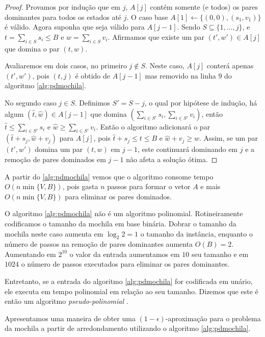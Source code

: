 \begin{proof}
Provamos por indução que em $j$, $A[j]$ contém somente (e todos) os pares dominantes para todos os estados até $j$. O caso base $A[1] \leftarrow \{(0,0),(s_1,v_1)\}$ é válido. Agora suponha que seja válido para $A[j-1]$. Sendo $S \subseteq \{1, \ldots, j\}$, e $t=\sum_{i \in S} s_i \leq B$ e $w = \sum_{i \in S} v_i$. Afirmamos que existe um par $(t',w') \in A[j]$ que domina o par $(t,w)$.

Avaliaremos em dois casos, no primeiro $j \notin S$. Neste caso, $A[j]$ conterá apenas $(t',w')$, pois $(t,j)$ é obtido de $A[j-1]$ mas removido na linha 9 do algoritmo \ref{alg:pdmochila}.

No segundo caso $j \in S$. Definimos $S' = S - {j}$, o qual por hipótese de indução, há algum $(\hat{t},\hat{w}) \in A[j-1]$ que domina $\left(\sum_{i \in S'} s_i,\sum_{i \in S'} v_i\right)$, então $\hat{t} \leq \sum_{i \in S'} s_i$ e $\hat{w} \geq \sum_{i \in S'} v_i$. Então o algoritmo adicionará o par $\left(\hat{t} + s_j, \hat{w} + v_j \right)$ para $A[j]$, pois $\hat{t} + s_j \leq t \leq B$ e $\hat{w} + v_j \geq w$. Assim, se um par $(t',w')$ domina um par $(t,w)$ em $j-1$, este continuará dominando em $j$ e a remoção de pares dominados em $j-1$ não afeta a solução ótima.

\end{proof}

A partir do \ref{alg:pdmochila} vemos que o algoritmo consome tempo $O(n \min\{V,B\})$, pois gasta $n$ passos para formar o vetor $A$ e mais $O(n \min\{V,B\})$ para eliminar os pares dominados.

O algoritmo \ref{alg:pdmochila} não é um algoritmo polinomial. Rotineiramente codificamos o tamanho da mochila em base binária. Dobrar o tamanho da mochila neste caso aumenta em $\log_2 2 = 1$ o tamanho da instância, enquanto o número de passos na remoção de pares dominantes aumenta $O(B) = 2$. Aumentando em $2^{10}$ o valor da entrada aumentamos em $10$ seu tamanho e em $1024$ o número de passos executados para eliminar os pares dominantes.

Entretanto, se a entrada do algoritmo \ref{alg:pdmochila} for codificada em unário, ele executa em tempo polinomial em relação ao seu tamanho. Dizemos que este é então um algoritmo \textit{pseudo-polinomial} \cite{Williamson}.

Apresentamos uma maneira de obter uma $(1 - \epsilon)$-aproximação para o problema da mochila a partir de arredondamento utilizando o algoritmo \ref{alg:pdmochila}.

